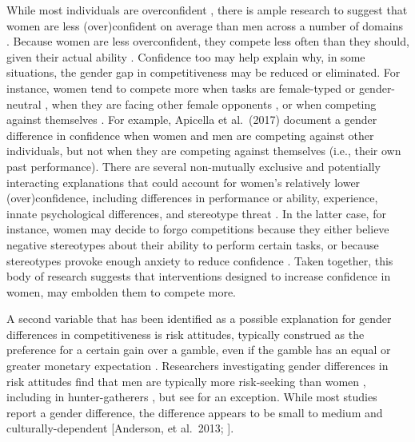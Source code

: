 \documentclass[a4paper, nobind]{templates/ociamthesis}
\begin{document}
While most individuals are overconfident \autocite{Alicke2013,Dunning2004b}, there is ample research to suggest that women are less (over)confident on average than men across a number of domains \autocite{Mobius2011,Niederle2011,Croson2009,Lundeberg1994,Niederle2007,Bertrand2010a,Beyer1990,Beyer1997,Jakobsson2013}. Because women are less overconfident, they compete less often than they should, given their actual ability \autocite{Niederle2007}. Confidence too may help explain why, in some situations, the gender gap in competitiveness may be reduced or eliminated. For instance, women tend to compete more when tasks are female-typed or gender-neutral \autocite{Iriberri2017,Boschini2014,Boschini2019,Apicella2015,Grosse2010,Gunther2010,Dreber2014,Dreber2011,Shurchkov2012}, when they are facing other female opponents \autocite{DattaGupta2013,Booth2012}, or when competing against themselves \autocite{Apicella2017a,Bonte2018,Carpenter2018,Apicella2020}. For example, Apicella et al.~(2017) document a gender difference in confidence when women and men are competing against other individuals, but not when they are competing against themselves (i.e., their own past performance). There are several non-mutually exclusive and potentially interacting explanations that could account for women's relatively lower (over)confidence, including differences in performance or ability, experience, innate psychological differences, and stereotype threat \autocite{Steele1997,Spencer1999,Spencer2016}. In the latter case, for instance, women may decide to forgo competitions because they either believe negative stereotypes about their ability to perform certain tasks, or because stereotypes provoke enough anxiety to reduce confidence \autocite{Gunther2010,Grosse2010,Iriberri2017,Shurchkov2012,Burow2017}. Taken together, this body of research suggests that interventions designed to increase confidence in women, may embolden them to compete more.

A second variable that has been identified as a possible explanation for gender differences in competitiveness is risk attitudes, typically construed as the preference for a certain gain over a gamble, even if the gamble has an equal or greater monetary expectation \autocite{Kahneman1982}. Researchers investigating gender differences in risk attitudes find that men are typically more risk-seeking than women \autocite{Eckel2008,Charness2012,Croson2009,Bertrand2010a}, including in hunter-gatherers \autocite{Apicella2017}, but see \autocite{Harrison2007} for an exception. While most studies report a gender difference, the difference appears to be small to medium \autocite{Filippin2016} and culturally-dependent {[}Anderson, et al.~2013; \textcite{Gneezy2009}{]}.
\end{document}
